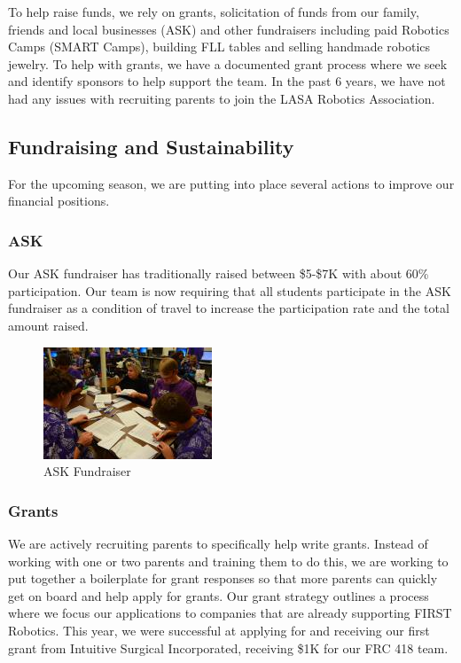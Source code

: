 To help raise funds, we rely on grants, solicitation of funds from our family, friends and local businesses (ASK) and other fundraisers including paid Robotics Camps (SMART Camps), building FLL tables and selling handmade robotics jewelry.  To help with grants, we have a documented grant process where we seek and identify sponsors to help support the team. In the past 6 years, we have not had any issues with recruiting parents to join the LASA Robotics Association.

\subsection{Fundraising and Sustainability}
For the upcoming season, we are putting into place several actions to improve our financial positions.

\subsubsection{ASK}
Our ASK fundraiser has traditionally raised between \$5-\$7K with about 60\% participation.  Our team is now requiring that all students participate in the ASK fundraiser as a condition of travel to increase the participation rate and the total amount raised.  

\begin{figure}
	\color{darkgray}
	\centering
	\includegraphics[height=0.3\linewidth]{ask}
	\caption[]{ASK Fundraiser}
	\label{fig:ask}
\end{figure}

\subsubsection{Grants}
We are actively recruiting parents to specifically help write grants.  Instead of working with one or two parents and training them to do this, we are working to put together a boilerplate for grant responses so that more parents can quickly get on board and help apply for grants.  Our grant strategy outlines a process where we focus our applications to companies that are already supporting FIRST Robotics.  This year, we were successful at applying for and receiving our first grant from Intuitive Surgical Incorporated, receiving \$1K for our FRC 418 team.\\

